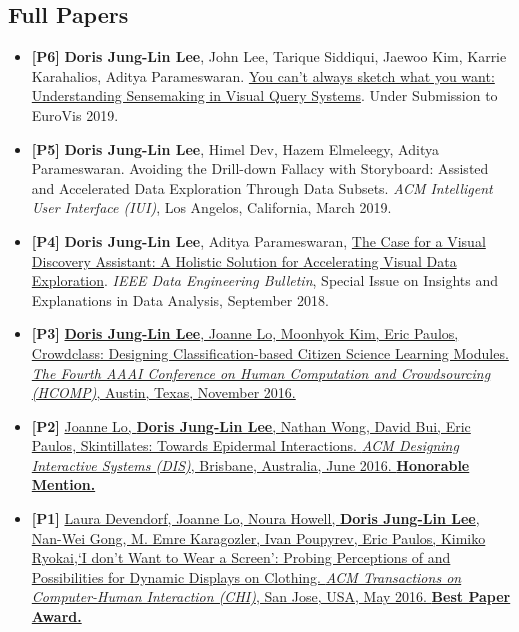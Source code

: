 \documentclass{res}
\begin{document}
\begin{resume}
\section{Full Papers}
\begin{itemize}[leftmargin=0in,label={}]
\item \textbf{[P6]} \textbf{Doris Jung-Lin Lee}, John Lee, Tarique Siddiqui, Jaewoo Kim, Karrie Karahalios, Aditya Parameswaran. \href{https://arxiv.org/abs/1710.00763}{You can't always sketch what you want: Understanding Sensemaking in Visual Query Systems}. Under Submission to EuroVis 2019.
\item \textbf{[P5]} \textbf{Doris Jung-Lin Lee}, Himel Dev, Hazem Elmeleegy, Aditya Parameswaran. Avoiding the Drill-down Fallacy with Storyboard: Assisted and Accelerated Data Exploration Through Data Subsets. \textit{ACM Intelligent User Interface (IUI)}, Los Angelos, California, March 2019.
\item \textbf{[P4]} \textbf{Doris Jung-Lin Lee}, Aditya Parameswaran, \href{http://sites.computer.org/debull/A18sept/p3.pdf}{The Case for a Visual Discovery Assistant: A Holistic Solution for Accelerating Visual Data Exploration}. \textit{IEEE Data Engineering Bulletin}, Special Issue on Insights and Explanations in Data Analysis, September 2018.
\item \textbf{[P3]} \href{http://aaai.org/ocs/index.php/HCOMP/HCOMP16/paper/viewFile/14027/13638}{\textbf{Doris Jung-Lin Lee}, Joanne Lo, Moonhyok Kim, Eric Paulos, Crowdclass: Designing Classification-based Citizen Science Learning Modules. \textit{The Fourth AAAI Conference on Human Computation and Crowdsourcing (HCOMP)}, Austin, Texas, November 2016.}
\item \textbf{[P2]} \href{http://dl.acm.org/citation.cfm?id=2901885&CFID=765226474&CFTOKEN=46922780}{Joanne Lo, \textbf{Doris Jung-Lin Lee}, Nathan Wong, David Bui, Eric Paulos, Skintillates: Towards Epidermal Interactions.  \textit{ACM Designing Interactive Systems (DIS)}, Brisbane, Australia, June 2016. \textbf{Honorable Mention.}}
\item \textbf{[P1]} \href{http://dl.acm.org/citation.cfm?id=2858192&CFID=765226474&CFTOKEN=46922780}{Laura Devendorf, Joanne Lo, Noura Howell, \textbf{Doris Jung-Lin Lee}, Nan-Wei Gong, M. Emre Karagozler, Ivan  Poupyrev, Eric Paulos, Kimiko Ryokai,\hspace{1pt}`I don't Want to Wear a Screen': Probing Perceptions of and Possibilities for Dynamic Displays on Clothing. \textit{ACM Transactions on Computer-Human Interaction (CHI)}, San Jose, USA, May 2016. \textbf{Best Paper Award.}}
\end{itemize}
\vspace{-10pt}

\end{resume}
\end{document}
